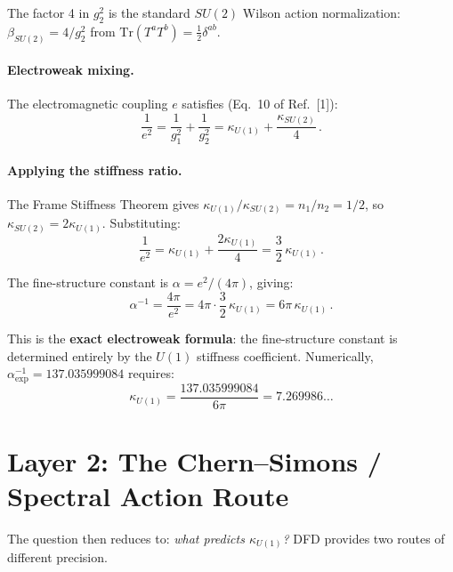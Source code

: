\documentclass[12pt,a4paper]{article}
\begin{document}
The factor 4 in $g_2^2$ is the standard $SU(2)$ Wilson action normalization:
$\beta_{SU(2)} = 4/g_2^2$ from $\mathrm{Tr}(T^a T^b) = \tfrac{1}{2}\delta^{ab}$.

\paragraph{Electroweak mixing.}
The electromagnetic coupling $e$ satisfies (Eq.~10 of Ref.~[1]):
\begin{equation}
\label{eq:ew-mixing}
\frac{1}{e^2} = \frac{1}{g_1^2} + \frac{1}{g_2^2}
= \kappa_{U(1)} + \frac{\kappa_{SU(2)}}{4}\,.
\end{equation}

\paragraph{Applying the stiffness ratio.}
The Frame Stiffness Theorem gives $\kappa_{U(1)}/\kappa_{SU(2)} = n_1/n_2 = 1/2$,
so $\kappa_{SU(2)} = 2\kappa_{U(1)}$.  Substituting:
\begin{equation}
\frac{1}{e^2} = \kappa_{U(1)} + \frac{2\kappa_{U(1)}}{4}
= \frac{3}{2}\,\kappa_{U(1)}\,.
\end{equation}

The fine-structure constant is $\alpha = e^2/(4\pi)$, giving:
\begin{equation}
\boxed{
\alpha^{-1} = \frac{4\pi}{e^2}
= 4\pi \cdot \frac{3}{2}\,\kappa_{U(1)}
= 6\pi\,\kappa_{U(1)}\,.
}
\label{eq:master}
\end{equation}

This is the \textbf{exact electroweak formula}: the fine-structure constant
is determined entirely by the $U(1)$ stiffness coefficient.
Numerically, $\alpha^{-1}_{\mathrm{exp}} = 137.035999084$ requires:
\begin{equation}
\kappa_{U(1)} = \frac{137.035999084}{6\pi} = 7.269986\ldots
\end{equation}

\section{Layer 2: The Chern--Simons / Spectral Action Route}
\label{sec:layer2}

The question then reduces to: \emph{what predicts $\kappa_{U(1)}$?}
DFD provides two routes of different precision.
\end{document}
